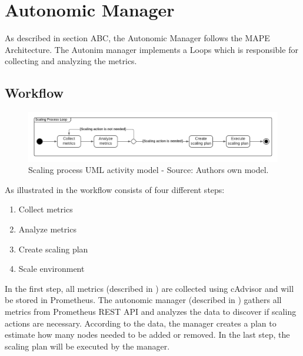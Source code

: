 \section{Autonomic Manager}
As described in section ABC, the Autonomic Manager follows the MAPE Architecture. The Autonim manager implements a Loops which is responsible for collecting and analyzing the metrics.


\subsection{Workflow}
\begin{figure}[h]%
\centering
\includegraphics[scale=0.6]{images/04_conceptual_design/01_scaling_process_model}%
\caption{Scaling process UML activity model - Source: Authors own model.}%
\label{fig:am-workflow-process_model}%
\end{figure}


As illustrated in  the workflow consists of four different steps:

\begin{enumerate}
\item Collect metrics
\item Analyze metrics
\item Create scaling plan
\item Scale environment
\end{enumerate}

In the first step, all metrics (described in ) are collected using cAdvisor and will be stored in Prometheus. The autonomic manager (described in ) gathers all metrics from Prometheus REST API and analyzes the data to discover if scaling actions are necessary. According to the data, the manager creates a plan to estimate how many nodes needed to be added or removed. In the last step, the scaling plan will be executed by the manager.



